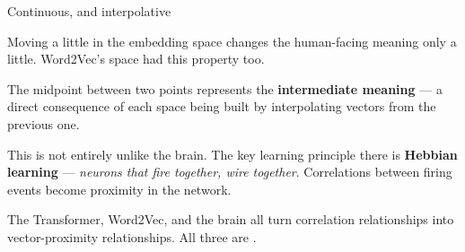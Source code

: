 \documentclass[aspectratio=169,11pt,t]{beamer}
\begin{document}
\begin{frame}[shrink=25]{Continuous, and interpolative}
\begin{minipage}[t]{0.494\textwidth}
\begin{icardaccent}
Moving a little in the embedding space changes the human-facing meaning only a little. Word2Vec's space had this property too.
\end{icardaccent}
\end{minipage}%
\hfill
\begin{minipage}[t]{0.494\textwidth}
\begin{icardaccent}
The midpoint between two points represents the \textbf{intermediate meaning} --- a direct consequence of each space being built by interpolating vectors from the previous one.
\end{icardaccent}
\end{minipage}%
{\fontsize{9.4}{12.6}\selectfont\color{fg2}This is not entirely unlike the brain. The key learning principle there is \textbf{Hebbian learning} --- \textit{neurons that fire together, wire together}. Correlations between firing events become proximity in the network.\par}\vskip 4pt
\begin{iband}[signal]
The Transformer, Word2Vec, and the brain all turn correlation relationships into vector-proximity relationships. All three are .
\end{iband}
\end{frame}
\end{document}
